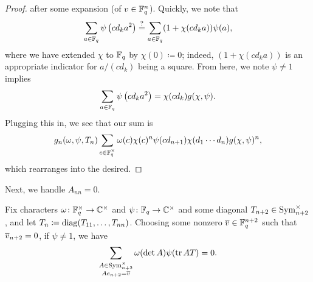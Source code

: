 \begin{proof}
    after some expansion (of $v\in\mathbb F_q^n$). Quickly, we note that
    \[\sum_{a\in\mathbb F_q}\psi\left(cd_ka^2\right)\stackrel?=\sum_{a\in\mathbb F_q}(1+\chi(cd_ka))\psi(a),\]
    where we have extended $\chi$ to $\mathbb F_q$ by $\chi(0)\coloneqq0$; indeed, $(1+\chi(cd_ka))$ is an appropriate indicator for $a/(cd_k)$ being a square. From here, we note $\psi\ne1$ implies
    \[\sum_{a\in\mathbb F_q}\psi\left(cd_ka^2\right)=\chi(cd_k)g(\chi,\psi).\]
    Plugging this in, we see that our sum is
    \[g_n(\omega,\psi,T_n)\sum_{c\in\mathbb F_q^\times}\omega(c)\chi(c)^n\psi(cd_{n+1})\chi(d_1\cdots d_n)g(\chi,\psi)^n,\]
    which rearranges into the desired.
\end{proof}
Next, we handle $A_{nn}=0$.
\begin{lemma} \label{lem:gsum-sym-ind-0}
    Fix characters $\omega\colon\mathbb F_q^\times\to\mathbb C^\times$ and $\psi\colon\mathbb F_q\to\mathbb C^\times$ and some diagonal $T_{n+2}\in\operatorname{Sym}^\times_{n+2}$, and let $T_n\coloneqq\operatorname{diag}(T_{11},\ldots,T_{nn})$. Choosing some nonzero $\overline{v}\in\mathbb F_q^{n+2}$ such that $\overline{v}_{n+2}=0$, if $\psi\ne1$, we have
    \[\sum_{\substack{A\in\operatorname{Sym}_{n+2}^\times\\Ae_{n+2}=\overline{v}}}\omega(\det A)\psi(\operatorname{tr} AT)=0.
    \]
\end{lemma}
